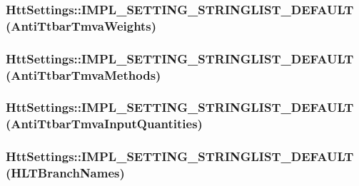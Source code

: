 \label{classHttSettings_a5ba7dd2259f54ac79ea4ca9c5f7690cf}
\hypertarget{classHttSettings_a96a750d3c33944e4e41172aac5b84aa1}{
\subsubsection[{IMPL\_\-SETTING\_\-STRINGLIST\_\-DEFAULT}]{\setlength{\rightskip}{0pt plus 5cm}HttSettings::IMPL\_\-SETTING\_\-STRINGLIST\_\-DEFAULT (AntiTtbarTmvaWeights)}}
\label{classHttSettings_a96a750d3c33944e4e41172aac5b84aa1}
\hypertarget{classHttSettings_a395368650c207e232b55d75f89786624}{
\subsubsection[{IMPL\_\-SETTING\_\-STRINGLIST\_\-DEFAULT}]{\setlength{\rightskip}{0pt plus 5cm}HttSettings::IMPL\_\-SETTING\_\-STRINGLIST\_\-DEFAULT (AntiTtbarTmvaMethods)}}
\label{classHttSettings_a395368650c207e232b55d75f89786624}
\hypertarget{classHttSettings_aa09d429dfbd5ad6b9e3b4d228f9aa7fe}{
\subsubsection[{IMPL\_\-SETTING\_\-STRINGLIST\_\-DEFAULT}]{\setlength{\rightskip}{0pt plus 5cm}HttSettings::IMPL\_\-SETTING\_\-STRINGLIST\_\-DEFAULT (AntiTtbarTmvaInputQuantities)}}
\label{classHttSettings_aa09d429dfbd5ad6b9e3b4d228f9aa7fe}
\hypertarget{classHttSettings_ad6b4742eaea19aeabc3ddcf31b69606f}{
\subsubsection[{IMPL\_\-SETTING\_\-STRINGLIST\_\-DEFAULT}]{\setlength{\rightskip}{0pt plus 5cm}HttSettings::IMPL\_\-SETTING\_\-STRINGLIST\_\-DEFAULT (HLTBranchNames)}}

